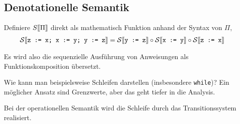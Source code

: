 \subsection{Denotationelle Semantik}

Definiere $S\mathrm{[}\kern-.14em\mathrm{[}\Pi\mathrm{]}\kern-.14em\mathrm{]}$ direkt als mathematisch Funktion anhand der Syntax von $\Pi$, \zb
\begin{align*}
    \mathcal{S}\mathrm{[}\kern-.14em\mathrm{[}\texttt{z := x; x := y; y := z}\mathrm{]}\kern-.14em\mathrm{]} & = \mathcal{S}\mathrm{[}\kern-.14em\mathrm{[}\texttt{y := z}\mathrm{]}\kern-.14em\mathrm{]} \circ \mathcal{S}\mathrm{[}\kern-.14em\mathrm{[}\texttt{x := y}\mathrm{]}\kern-.14em\mathrm{]} \circ \mathcal{S}\mathrm{[}\kern-.14em\mathrm{[}\texttt{z := x}\mathrm{]}\kern-.14em\mathrm{]}
\end{align*}

Es wird also \zb die sequenzielle Ausführung von Anweisungen als Funktionskomposition übersetzt.

\begin{remark}[Problem]
    Wie kann man beispielsweise Schleifen darstellen (insbesondere \texttt{while})? Ein möglicher Ansatz sind Grenzwerte, aber das geht tiefer in die Analysis.

    Bei der operationellen Semantik wird die Schleife durch das Transitionssystem realisiert.
\end{remark}